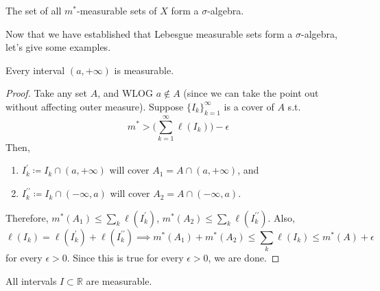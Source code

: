   \begin{corollary}
    The set of all $m^\ast$-measurable sets of $X$ form a $\sigma$-algebra. 
  \end{corollary}

  Now that we have established that Lebesgue measurable sets form a $\sigma$-algebra, let's give some examples. 

  \begin{theorem}
    Every interval $(a, +\infty)$ is measurable. 
  \end{theorem}
  \begin{proof}
    Take any set $A$, and WLOG $a \not\in A$ (since we can take the point out without affecting outer measure). Suppose $\{I_k\}_{k=1}^\infty$ is a cover of $A$ s.t. 
    \begin{equation}
      m^\ast > \bigg( \sum_{k=1}^\infty \ell (I_k) \bigg) - \epsilon 
    \end{equation}
    Then, 
    \begin{enumerate}
      \item $I_k^\prime \coloneqq I_k \cap (a, +\infty)$ will cover $A_1 = A \cap (a, +\infty)$, and 
      \item $I_k^{\prime\prime} \coloneqq I_k \cap (-\infty, a)$ will cover $A_2 = A \cap (-\infty, a)$. 
    \end{enumerate}
    Therefore, $m^\ast (A_1)  \leq \sum_k \ell(I_k^\prime)$, $m^\ast (A_2) \leq \sum_k \ell(I_k^{\prime\prime})$. Also, 
    \begin{equation}
      \ell(I_k) = \ell(I_k^\prime) + \ell(I_k^{\prime\prime}) \implies m^\ast (A_1) + m^\ast (A_2) \leq \sum_k \ell(I_k) \leq m^\ast (A) + \epsilon
    \end{equation}
    for every $\epsilon > 0$. Since this is true for every $\epsilon > 0$, we are done.  
  \end{proof}

  \begin{corollary}
    All intervals $I \subset \mathbb{R}$ are measurable. 
  \end{corollary}

  \begin{example}
    
  \end{example}

  \begin{theorem}
    
  \end{theorem}

